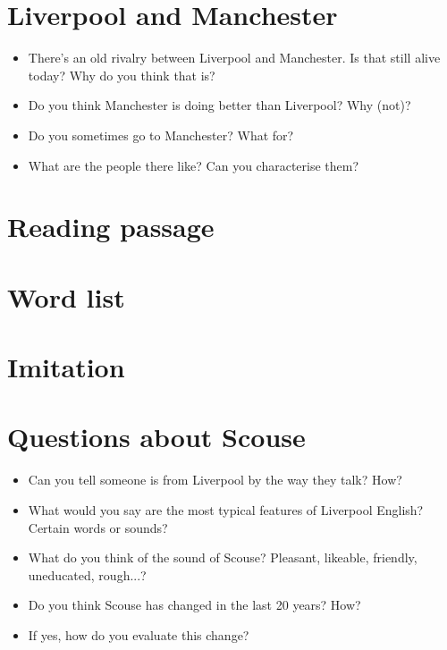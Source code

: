 	\section*{Liverpool and Manchester}
	\begin{multicols}{2}
		\begin{itemize}
			\item There's an old rivalry between Liverpool and Manchester. Is that still alive today? Why do you think that is?
			\item Do you think Manchester is doing better than Liverpool? Why (not)?
			\item Do you sometimes go to Manchester? What for?
			\item What are the people there like? Can you characterise them?
		\end{itemize}
	\end{multicols}
	
	\section*{Reading passage}

	\section*{Word list}

	\section*{Imitation}

	\section*{Questions about Scouse}
	\begin{multicols}{2}
		\begin{itemize}
			\item Can you tell someone is from Liverpool by the way they talk? How?
			\item What would you say are the most typical features of Liverpool English? Certain words or sounds?
			\item What do you think of the sound of Scouse? Pleasant, likeable, friendly, uneducated, rough...?
			\item Do you think Scouse has changed in the last 20 years? How? 
			\item If yes, how do you evaluate this change?
		\end{itemize}		
	\end{multicols}